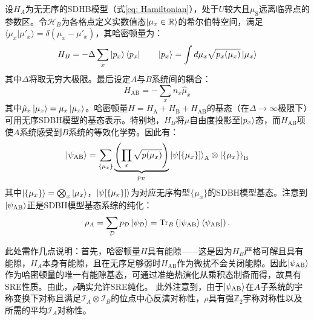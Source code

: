 \documentclass[preprint,superscriptaddress,floatfix, nofootinbib]{revtex4-2}
\begin{document}
设$H_A$为无无序的SDHB模型（式\eqref{eq: Hamiltonian}），处于$U$较大且$\mu_{\text{S}}$远离临界点的参数区。令$\mathcal{H}_B$为各格点定义实数值态$\ket{\mu_x \in \mathbb{R}}$的希尔伯特空间，满足$\langle \mu_x|\mu'_x\rangle =  \delta(\mu_x - \mu'_x)$，其哈密顿量为：
\begin{equation}
    H_{B} = -\Delta \sum_{x} \ket{p_x} \bra{p_x} \qquad \ket{p_x} = \int d\mu_x \sqrt{p_x(\mu_x)} \ket{\mu_x}
\end{equation}
其中$\Delta$将取无穷大极限。最后设定$A$与$B$系统间的耦合：
\begin{equation}
    H_{\text{AB}} = - \sum_{x} n_x \hat{\mu}_x
\end{equation}
其中$\hat{\mu}_x \ket{\mu_x} = \mu_x \ket{\mu_x}$。哈密顿量$H = H_{\text{A}} + H_{\text{B}} + H_{\text{AB}}$的基态（在$\Delta \to \infty$极限下）可用无序SDBH模型的基态表示。特别地，$H_B$将$\mu$自由度投影至$\ket{p_x}$态，而$H_{\text{AB}}$项使$A$系统感受到$B$系统的等效化学势。因此有：
\begin{equation}
    \ket{\psi_{\text{AB}}} = \sum_{\{\mu_x\}} \underbrace{\left(\prod_{x} \sqrt{p(\mu_x)} \right)}_{p_{\mathcal{D}}} \ket{\psi[\{\mu_x\}]}_{\text{A}} \otimes \ket{\{\mu_x\}}_{\text{B}}
\end{equation}
其中$\ket{\{\mu_x\}} = \bigotimes_x\ket{\mu_x}$，$\ket{\psi[\{\mu_x\}]}$为对应无序构型$\{\mu_x\}$的SDBH模型基态。注意到$\ket{\psi_{\text{AB}}}$正是SDBH模型基态系综的纯化：
\begin{equation}
    \rho_A = \sum_{\mathcal{D}} p_{\mathcal{D}} \ket{\psi_{\mathcal{D}}} = \text{Tr}_B\left(\ket{\psi_{\text{AB}}}\bra{\psi_{\text{AB}}}\right).
\end{equation}

此处需作几点说明：首先，哈密顿量$H$具有能隙——这是因为$H_B$严格可解且具有能隙，$H_A$本身有能隙，且在无序足够弱时$H_{\text{AB}}$作为微扰不会关闭能隙。因此$\ket{\psi_{\text{AB}}}$作为哈密顿量的唯一有能隙基态，可通过准绝热演化从乘积态制备而得，故具有SRE性质。由此，$\rho$确实允许SRE纯化。
此外注意到，由于$\ket{\psi_{\text{AB}}}$在$A$子系统的宇称变换下对称且满足$\mathcal{I}_A \otimes \mathcal{I}_B$的位点中心反演对称性，$\rho$具有强$\mathbb{Z}_2$宇称对称性以及所需的平均$\mathcal{I}_A$对称性。
\end{document}
